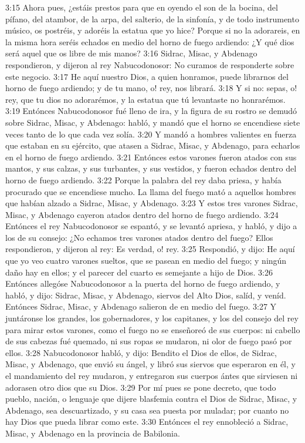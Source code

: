 3:15 Ahora pues, ¿estáis prestos para que en oyendo el son de la bocina, del pífano, del atambor, de la arpa, del salterio, de la sinfonía, y de todo instrumento músico, os postréis, y adoréis la estatua que yo hice? Porque si no la adorareis, en la misma hora seréis echados en medio del horno de fuego ardiendo: ¿Y qué dios será aquel que os libre de mis manos?
3:16 Sidrac, Misac, y Abdenago respondieron, y dijeron al rey Nabucodonosor: No curamos de responderte sobre este negocio.
3:17 He aquí nuestro Dios, a quien honramos, puede librarnos del horno de fuego ardiendo; y de tu mano, o! rey, nos librará.
3:18 Y si no: sepas, o! rey, que tu dios no adorarémos, y la estatua que tú levantaste no honrarémos.
3:19 Entónces Nabucodonosor fué lleno de ira, y la figura de su rostro se demudó sobre Sidrac, Misac, y Abdenago: habló, y mandó que el horno se encendiese siete veces tanto de lo que cada vez solía.
3:20 Y mandó a hombres valientes en fuerza que estaban en su ejército, que atasen a Sidrac, Misac, y Abdenago, para echarlos en el horno de fuego ardiendo.
3:21 Entónces estos varones fueron atados con sus mantos, y sus calzas, y sus turbantes, y sus vestidos, y fueron echados dentro del horno de fuego ardiendo.
3:22 Porque la palabra del rey daba priesa, y había procurado que se encendiese mucho. La llama del fuego mató a aquellos hombres que habían alzado a Sidrac, Misac, y Abdenago.
3:23 Y estos tres varones Sidrac, Misac, y Abdenago cayeron atados dentro del horno de fuego ardiendo.
3:24 Entónces el rey Nabucodonosor se espantó, y se levantó apriesa, y habló, y dijo a los de su consejo: ¿No echamos tres varones atados dentro del fuego? Ellos respondieron, y dijeron al rey: Es verdad, o! rey.
3:25 Respondió, y dijo: He aquí que yo veo cuatro varones sueltos, que se pasean en medio del fuego; y ningún daño hay en ellos; y el parecer del cuarto es semejante a hijo de Dios.
3:26 Entónces allegóse Nabucodonosor a la puerta del horno de fuego ardiendo, y habló, y dijo: Sidrac, Misac, y Abdenago, siervos del Alto Dios, salíd, y veníd. Entónces Sidrac, Misac, y Abdenago salieron de en medio del fuego.
3:27 Y juntáronse los grandes, los gobernadores, y los capitanes, y los del consejo del rey para mirar estos varones, como el fuego no se enseñoreó de sus cuerpos: ni cabello de sus cabezas fué quemado, ni sus ropas se mudaron, ni olor de fuego pasó por ellos.
3:28 Nabucodonosor habló, y dijo: Bendito el Dios de ellos, de Sidrac, Misac, y Abdenago, que envió su ángel, y libró sus siervos que esperaron en él, y el mandamiento del rey mudaron, y entregaron sus cuerpos ántes que sirviesen ni adorasen otro dios que su Dios.
3:29 Por mí pues se pone decreto, que todo pueblo, nación, o lenguaje que dijere blasfemia contra el Dios de Sidrac, Misac, y Abdenago, sea descuartizado, y su casa sea puesta por muladar; por cuanto no hay Dios que pueda librar como este.
3:30 Entónces el rey ennobleció a Sidrac, Misac, y Abdenago en la provincia de Babilonia.

